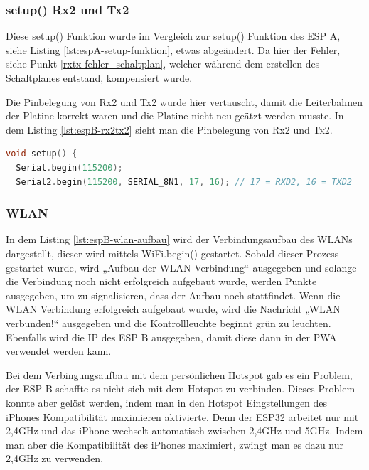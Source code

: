 \subsubsection{setup() Rx2 und Tx2}
Diese setup() Funktion wurde im Vergleich zur setup() Funktion des ESP A, siehe Listing \ref{lst:espA-setup-funktion}, etwas abgeändert. 
Da hier der Fehler, siehe Punkt \ref{rxtx-fehler_schaltplan}, welcher während dem erstellen des Schaltplanes entstand, kompensiert wurde.

\noindent
Die Pinbelegung von Rx2 und Tx2 wurde hier vertauscht, damit die Leiterbahnen der Platine korrekt waren und die Platine nicht neu geätzt werden musste. 
In dem Listing \ref{lst:espB-rx2tx2} sieht man die Pinbelegung von Rx2 und Tx2.

\begin{lstlisting}[language=C++, caption={setup() von Rx2 und Tx2}, label={lst:espB-rx2tx2}, firstnumber=36]
void setup() {
  Serial.begin(115200);
  Serial2.begin(115200, SERIAL_8N1, 17, 16); // 17 = RXD2, 16 = TXD2
\end{lstlisting}

\subsubsection{WLAN}
In dem Listing \ref{lst:espB-wlan-aufbau} wird der Verbindungsaufbau des WLANs dargestellt, dieser wird mittels WiFi.begin() gestartet. Sobald dieser Prozess gestartet wurde, wird „Aufbau der WLAN Verbindung“ ausgegeben und solange die Verbindung noch nicht erfolgreich aufgebaut wurde, werden Punkte ausgegeben, um zu signalisieren, dass der Aufbau noch stattfindet. Wenn die WLAN Verbindung erfolgreich aufgebaut wurde, wird die Nachricht „WLAN verbunden!“ ausgegeben und die Kontrollleuchte beginnt grün zu leuchten. Ebenfalls wird die IP des ESP B ausgegeben, damit diese dann in der PWA verwendet werden kann.

\par\vspace{1em}

\noindent
Bei dem Verbingungsaufbau mit dem persönlichen Hotspot gab es ein Problem, der ESP B schaffte es nicht sich mit dem Hotspot zu verbinden.
Dieses Problem konnte aber gelöst werden, indem man in den Hotspot Eingstellungen des iPhones Kompatibilität maximieren aktivierte.
Denn der ESP32 arbeitet nur mit 2,4GHz und das iPhone wechselt automatisch zwischen 2,4GHz und 5GHz. 
Indem man aber die Kompatibilität des iPhones maximiert, zwingt man es dazu nur 2,4GHz zu verwenden.

